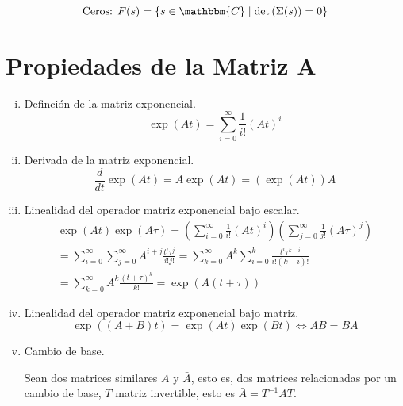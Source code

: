         \begin{equation}
            \text{Ceros: } F(s) = \left\{ s \in \mathbbm{C} \mid \det{\left( \Sigma(s) \right)} = 0 \right\}
        \end{equation}

    \section{Propiedades de la Matriz A}
        \begin{enumerate}[i)]
            \item Definción de la matriz exponencial.
            \begin{equation}
                \exp{(A t)} = \sum\limits_{i=0}^{\infty} \frac{1}{i!} (A t)^i
            \end{equation}

            \item Derivada de la matriz exponencial.
            \begin{equation}
                \frac{d}{dt} \exp{(A t)} = A \exp{(A t)} = (\exp{(A t)}) A
            \end{equation}

            \item Linealidad del operador matriz exponencial bajo escalar.
            \begin{multline}
                \exp{(At)} \exp{(A \tau)} = \left( \sum\limits_{i=0}^{\infty} \frac{1}{i!} (A t)^i \right) \left( \sum\limits_{j=0}^{\infty} \frac{1}{j!} (A \tau)^j \right) \\
                = \sum\limits_{i=0}^{\infty} \sum\limits_{j=0}^{\infty} A^{i+j} \frac{t^i \tau^j}{i! j!} = \sum\limits_{k=0}^{\infty} A^k \sum\limits_{i=0}^{k} \frac{t^i \tau^{k-i}}{i! (k-i)!} \\
                = \sum\limits_{k=0}^{\infty} A^k \frac{(t + \tau)^k}{k!} = \exp{(A(t + \tau))}
            \end{multline}

            \item Linealidad del operador matriz exponencial bajo matriz.
            \begin{equation}
                \exp{((A + B) t)} = \exp{(A t)} \exp{(B t)} \iff A B = B A
            \end{equation}

            \item Cambio de base.

            Sean dos matrices similares $A$ y $\bar{A}$, esto es, dos matrices relacionadas por un cambio de base, $T$ matriz invertible, esto es $\bar{A} = T^{-1} A T$.


\end{enumerate}
